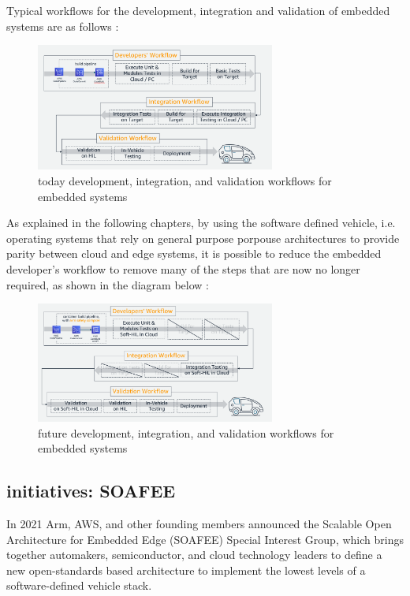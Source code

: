 Typical workflows for the development, integration and validation of embedded systems are as follows \cite{DevelopersWorkflow}:
\begin{figure}[h]  %
    \centering
    \includegraphics[width=0.7\textwidth]{images/today_developer_workflow.png}  %
    \caption{today development, integration, and validation workflows for embedded systems}
    \label{fig:TodayDeveloperWorkflow}
\end{figure}

As explained in the following chapters, by using the software defined vehicle, i.e. operating systems that rely on general purpose porpouse architectures to provide parity between cloud and edge systems, it is possible to reduce the embedded developer's workflow to remove many of the steps that are now no longer required, as shown in the diagram below \cite{DevelopersWorkflow}:
\begin{figure}[h]  %
    \centering
    \includegraphics[width=0.7\textwidth]{images/future_developers_workflow.png}  %
    \caption{future development, integration, and validation workflows for embedded systems}
    \label{fig:FutureDevelopersWorkflow}
\end{figure}

\subsection{initiatives: SOAFEE}
In 2021 Arm, AWS, and other founding members announced the Scalable Open Architecture for Embedded Edge (SOAFEE) Special Interest Group, which brings together automakers, semiconductor, and cloud technology leaders to define a new open-standards based architecture to implement the lowest levels of a software-defined vehicle stack. \cite{DevelopersWorkflow}

